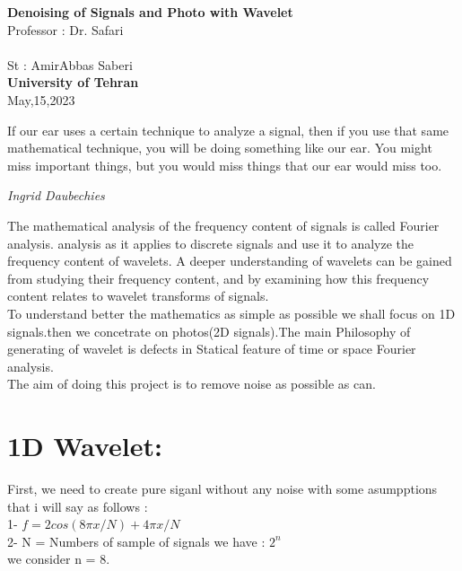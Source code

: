 \documentclass[12pt]{article}
\begin{document}
\begin{center}
\textbf{Denoising of Signals and Photo with Wavelet} \\[1in]
Professor : Dr. Safari\\~\\
St : AmirAbbas Saberi
\\[4in]
\textbf{University of Tehran}\\
May,15,2023
\end{center}
	\thispagestyle{firstpage}
\newpage
If our ear uses a certain technique to analyze a signal, then if
you use that same mathematical technique, you will be doing
something like our ear. You might miss important things, but
you would miss things that our ear would miss too.
 \begin{flushright}
 \textit{Ingrid Daubechies}
  \end{flushright} 
 The mathematical analysis of the frequency content of signals is called
Fourier analysis. 
analysis as it applies to discrete signals and use it to analyze the frequency
content of wavelets. A deeper understanding of wavelets can be gained from
studying their frequency content, and by examining how this frequency
content relates to wavelet transforms of signals.  \\
To understand better the mathematics
as simple as possible we shall focus on 1D signals.then we concetrate on photos(2D signals).The main Philosophy of generating of wavelet is defects in Statical feature of time or space Fourier analysis.\\
The aim of doing this project is to remove noise as possible as can.

\section{1D Wavelet:}
First, we need to create pure siganl without any noise with some asumpptions that i will say as follows :\\
1- $ f =  2cos( {8 \pi x}/N ) + {4 \pi x}/N$\\
2- N = Numbers of sample of signals we have : $2^n$ \\
we consider n = 8.
\end{document}
